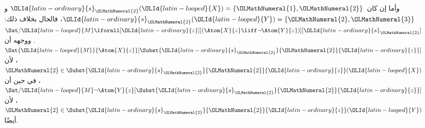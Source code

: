 \documentclass[../../../include/open-logic-section]{subfiles}
\begin{document}
\begin{ex}
  وأما إن كان~$\OLId{latin-ordinary}{s}_\OLMathNumeral{2}(\OLId{latin-looped}{X}) = \{\OLMathNumeral{1}, \OLMathNumeral{2}\}$ و
  $\OLId{latin-ordinary}{s}_\OLMathNumeral{2}(\OLId{latin-looped}{Y}) = \{\OLMathNumeral{2}, \OLMathNumeral{3}\}$، فالحال بخلاف ذلك:
  $\Sat/{\OLId{latin-looped}{M}}{\lforall[\OLId{latin-ordinary}{z}][(\Atom{X}{z} \liff \lnot
      \Atom{Y}{z})]}[\OLId{latin-ordinary}{s}_\OLMathNumeral{2}]$. ووجهه أن
  $\Sat{\OLId{latin-looped}{M}}{\Atom{X}{z}}[\Subst{\OLId{latin-ordinary}{s}_\OLMathNumeral{2}}{\OLMathNumeral{2}}{\OLId{latin-ordinary}{z}}]$، لأن
  $\OLMathNumeral{2} \in \Subst{\OLId{latin-ordinary}{s}_\OLMathNumeral{2}}{\OLMathNumeral{2}}{\OLId{latin-ordinary}{z}}(\OLId{latin-looped}{X})$، في حين أن
  $\Sat/{\OLId{latin-looped}{M}}{\lnot \Atom{Y}{z}}[\Subst{\OLId{latin-ordinary}{s}_\OLMathNumeral{2}}{\OLMathNumeral{2}}{\OLId{latin-ordinary}{z}}]$، لأن
  $\OLMathNumeral{2} \in \Subst{\OLId{latin-ordinary}{s}_\OLMathNumeral{2}}{\OLMathNumeral{2}}{\OLId{latin-ordinary}{z}}(\OLId{latin-looped}{Y})$ أيضًا.
\end{ex}
\end{document}

